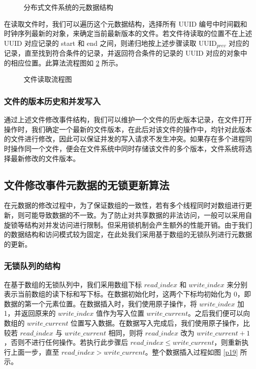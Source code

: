 \begin{figure}[!htb]
\centering
\resizebox{.8\textwidth}{!}{}
\caption{分布式文件系统的元数据结构}
\label{p15}
\end{figure}

在读取文件时，我们可以遍历这个元数据结构，选择所有 UUID 编号中时间戳和时钟序列最新的对象，来确定当前最新版本的文件。若文件待读取的位置不在上述 UUID 对应记录的 start 和 end 之间，则递归地按上述步骤读取 UUID$_{prev}$ 对应的记录，直至找到符合条件的记录，并返回符合条件的记录的 UUID 对应的对象中的相应位置。此算法流程图如 \ref{p21} 所示。

\begin{figure}[!htb]
\centering
\resizebox{.8\textwidth}{!}{}
\caption{文件读取流程图}
\label{p21}
\end{figure}
\subsubsection{文件的版本历史和并发写入}
通过上述文件修改事件结构，我们可以维护一个文件的历史版本记录，在文件打开操作时，我们确定一个最新的文件版本，在此后对该文件的操作中，均针对此版本的文件进行修改，因此可以保证并发的写入请求不发生冲突。如果存在多个进程同时操作同一个文件，便会在文件系统中同时存储该文件的多个版本，文件系统将选择最新修改的文件版本。
\subsection{文件修改事件元数据的无锁更新算法}
在元数据的修改过程中，为了保证数组的一致性，若有多个线程同时对数组进行更新，则可能导致数据的不一致。为了防止对共享数据的非法访问，一般可以采用自旋锁等结构对并发访问进行限制。但采用锁机制会产生额外的性能开销。由于我们的数据结构和访问模式较为固定，在此处我们采用基于数组的无锁队列进行元数据的更新。
\subsubsection{无锁队列的结构}
在基于数组的无锁队列中，我们采用数组下标 $read\_index$ 和 $write\_index$ 来分别表示当前数组的读下标和写下标。在数据初始化时，这两个下标均初始化为 0，即数据的第一个元素位置。在数据插入时，我们使用原子操作，将 $write\_index$ 加 1，并返回原来的 $write\_index$ 值作为写入位置 $write\_current$。之后我们便可以向数组的 $write\_current$ 位置写入数据。在数据写入完成后，我们使用原子操作，比较若 $read\_index$ 与 $write\_current$ 相同，则将 $read\_index$ 改为 $write\_current+1$，否则不进行任何操作。若执行此步骤后 $read\_index \leq write\_current$，则重新执行上面一步，直至 $read\_index>write\_current$。整个数据插入过程如图 \ref{p19} 所示。

